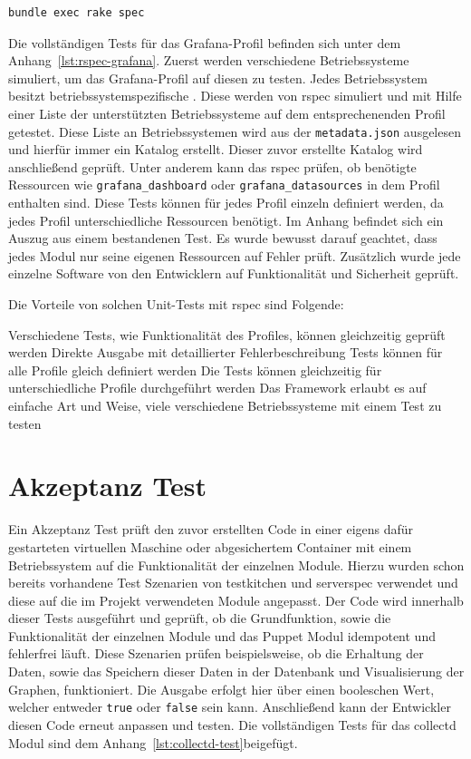 \begin{verbatim}
bundle exec rake spec
\end{verbatim}

Die vollständigen Tests für das Grafana\hyp{}Profil befinden sich unter dem
Anhang~\ref{lst:rspec-grafana}. Zuerst werden verschiedene Betriebssysteme
simuliert, um das Grafana\hyp{}Profil auf diesen zu testen. Jedes
Betriebssystem besitzt betriebssystemspezifische . Diese
werden von rspec simuliert und mit Hilfe einer Liste der unterstützten
Betriebssysteme auf dem entsprechenenden Profil getestet. Diese Liste an
Betriebssystemen wird aus der \texttt{metadata.json} ausgelesen und hierfür
immer ein Katalog erstellt. Dieser zuvor erstellte Katalog wird anschließend
geprüft. Unter anderem kann das rspec prüfen, ob benötigte Ressourcen wie
\texttt{grafana\_dashboard} oder \texttt{grafana\_datasources} in dem Profil
enthalten sind. Diese Tests können für jedes Profil einzeln definiert werden,
da jedes Profil unterschiedliche Ressourcen benötigt. Im Anhang befindet sich
ein Auszug aus einem bestandenen Test. Es wurde bewusst darauf geachtet, dass
jedes Modul nur seine eigenen Ressourcen auf Fehler prüft. Zusätzlich wurde
jede einzelne Software von den Entwicklern auf Funktionalität und Sicherheit
geprüft.

Die Vorteile von solchen Unit\hyp{}Tests mit rspec sind Folgende:

\begin{outline}
  \1 Verschiedene Tests, wie Funktionalität des Profiles, können gleichzeitig
  geprüft werden
  \1 Direkte Ausgabe mit detaillierter Fehlerbeschreibung
  \1 Tests können für alle Profile gleich definiert werden
  \1 Die Tests können gleichzeitig für unterschiedliche Profile durchgeführt
  werden
  \1 Das Framework erlaubt es auf einfache Art und Weise, viele verschiedene
  Betriebssysteme mit einem Test zu testen
\end{outline}
\mr%

\section{Akzeptanz Test}
Ein Akzeptanz Test prüft den zuvor erstellten Code in einer eigens dafür
gestarteten virtuellen Maschine oder abgesichertem Container mit einem
Betriebssystem auf die Funktionalität der einzelnen Module. Hierzu wurden schon
bereits vorhandene Test Szenarien von \gls{testkitchen} und \gls{serverspec}
verwendet und diese auf die im Projekt verwendeten Module angepasst. Der Code
wird innerhalb dieser Tests ausgeführt und geprüft, ob die Grundfunktion, sowie
die Funktionalität der einzelnen Module und das Puppet Modul idempotent und
fehlerfrei läuft. Diese Szenarien prüfen beispielsweise, ob die Erhaltung der
Daten, sowie das Speichern dieser Daten in der Datenbank und Visualisierung der
Graphen, funktioniert. Die Ausgabe erfolgt hier über einen booleschen Wert,
welcher entweder \texttt{true} oder \texttt{false} sein kann. Anschließend kann
der Entwickler diesen Code erneut anpassen und testen. Die vollständigen Tests
für das collectd Modul sind dem Anhang~\ref{lst:collectd-test}beigefügt.

